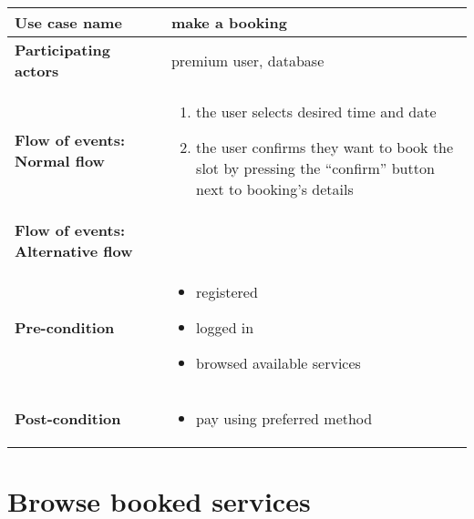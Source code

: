 \documentclass[a4paper, 13pt, draft]{report}
\begin{document}
\begin{center}
	\begin{tabular}{| >{\bf}l | p{5.55cm} |} 
		\hline
		Use case name & make a booking \\ 
		\hline
		Participating actors & premium user, database \\
		\hline
		Flow of events: Normal flow & 
		\begin{enumerate}		
			\item the user selects desired time and date
			\item the user confirms they want to book the slot by pressing the ``confirm'' button next to booking's details
		\end{enumerate}	\\
		\hline
		Flow of events: Alternative flow & \notapplicable \\
		\hline
		Pre-condition & 
		\begin{itemize} 
			\item registered
			\item logged in
			\item browsed available services
		\end{itemize} \\
		\hline
		Post-condition & 
		\begin{itemize} 
			\item pay using preferred method
		\end{itemize} \\ 
		\hline
	\end{tabular}
\end{center}

\section*{Browse booked services}
\end{document}
